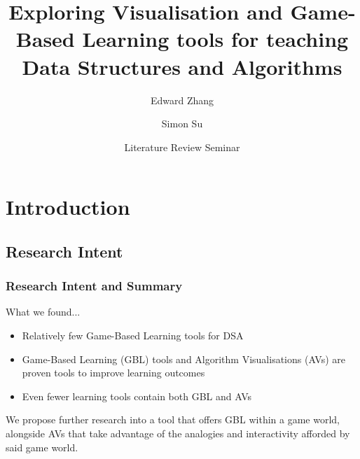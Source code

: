 \documentclass{beamer}
\title[Visualisation and GBL for DSA teaching] %
{Exploring Visualisation and Game-Based Learning tools for teaching Data Structures and Algorithms}
\author{Edward Zhang \and Simon Su}
\institute[UoA] %
{
  Department of ECSE\\
  The University of Auckland
}
\date[May 2019] %
{Literature Review Seminar}
\begin{document}
\frame{\titlepage}
\section{Introduction}
\subsection{Research Intent}
\begin{frame}
  \frametitle{Research Intent and Summary}
  What we found...
  \begin{itemize}
    \item Relatively few Game-Based Learning tools for DSA
    \item Game-Based Learning (GBL) tools and Algorithm Visualisations (AVs) are proven tools to improve learning outcomes
    \item Even fewer learning tools contain both GBL and AVs
  \end{itemize}
  \pause
  We propose further research into a tool that offers GBL within a game world, alongside AVs that take advantage of the analogies and interactivity afforded by said game world.
\end{frame}
\end{document}
